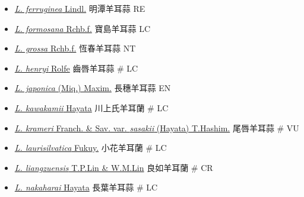 \begin{itemize}
\begin{itemize}
        \item[] \href{http://www.theplantlist.org/tpl1.1/search?q=Liparis+ferruginea}{\textit{L. ferruginea} Lindl.}   明潭羊耳蒜   RE
        \item[] \href{http://www.theplantlist.org/tpl1.1/search?q=Liparis+formosana}{\textit{L. formosana} Rchb.f.}   寶島羊耳蒜   LC
        \item[] \href{http://www.theplantlist.org/tpl1.1/search?q=Liparis+grossa}{\textit{L. grossa} Rchb.f.}   恆春羊耳蒜   NT
        \item[] \href{http://www.theplantlist.org/tpl1.1/search?q=Liparis+henryi}{\textit{L. henryi} Rolfe}   齒唇羊耳蒜  \# LC
        \item[] \href{http://www.theplantlist.org/tpl1.1/search?q=Liparis+japonica}{\textit{L. japonica} (Miq.) Maxim.}   長穗羊耳蒜   EN
        \item[] \href{http://www.theplantlist.org/tpl1.1/search?q=Liparis+kawakamii}{\textit{L. kawakamii} Hayata}   川上氏羊耳蘭  \# LC
        \item[] \href{http://www.theplantlist.org/tpl1.1/search?q=Liparis+krameri+var.+sasakii}{\textit{L. krameri} Franch. \& Sav. var. \textit{sasakii} (Hayata) T.Hashim.}   尾唇羊耳蒜  \# VU
        \item[] \href{http://www.theplantlist.org/tpl1.1/search?q=Liparis+laurisilvatica}{\textit{L. laurisilvatica} Fukuy.}   小花羊耳蘭  \# LC
        \item[] \href{http://www.theplantlist.org/tpl1.1/search?q=Liparis+liangzuensis}{\textit{L. liangzuensis} T.P.Lin \& W.M.Lin}   良如羊耳蘭  \# CR
        \item[] \href{http://www.theplantlist.org/tpl1.1/search?q=Liparis+nakaharai}{\textit{L. nakaharai} Hayata}   長葉羊耳蒜  \# LC

\end{itemize}
\end{itemize}
